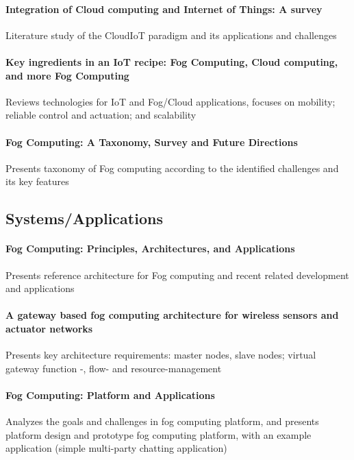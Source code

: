 \paragraph{Integration of Cloud computing and Internet of Things: A survey}\cite{botta_integration_2016}
Literature study of the CloudIoT paradigm and its applications and challenges

\paragraph{Key ingredients in an IoT recipe: Fog Computing, Cloud computing, and more Fog Computing}\cite{yannuzzi_key_2014}
Reviews technologies for IoT and Fog/Cloud applications, focuses on mobility; reliable control and actuation; and scalability

\paragraph{Fog Computing: A Taxonomy, Survey and Future Directions}\cite{mahmud_fog_2016}
Presents taxonomy of Fog computing according to the identified challenges and its key features


\subsection{Systems/Applications}

\paragraph{Fog Computing: Principles, Architectures, and Applications}\cite{dastjerdi_fog_2016}
Presents reference architecture for Fog computing and recent related development and applications

\paragraph{A gateway based fog computing architecture for wireless sensors and actuator networks \cite{7423332}}
Presents key architecture requirements: master nodes, slave nodes; virtual gateway function -, flow- and resource-management


\paragraph{Fog Computing: Platform and Applications} \cite{yi_fog_2015}
Analyzes the goals and challenges in fog computing platform, and presents platform design and prototype fog computing platform, with an example application (simple multi-party chatting application)

